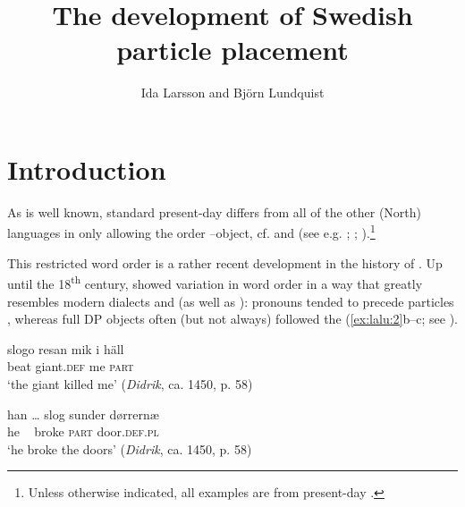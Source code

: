 \documentclass[output=paper]{langscibook}
\author{Ida Larsson\orcid{}\affiliation{Østfold University College, Halden} and Björn Lundquist\affiliation{The Arctic University of Norway, Tromsø}}
\title{The development of Swedish particle placement}
\begin{document}
\maketitle 

\section{Introduction}\label{sec:lalu:1}

\begin{sloppypar}
As is well known, standard present-day  differs from all of the other (North)  languages in only allowing the order –object, cf.  and  (see e.g. \citealt{Svenonius1996, Svenonius2003, Svenonius1996}; \citealt{Toivonen2003}; \citealt{Lundquist2014Active}).\footnote{Unless otherwise indicated, all examples are from present-day .}
\end{sloppypar}

\ea\label{ex:lalu:1}
\z
\z


This restricted word order is a rather recent development in the history of . Up until the 18\textsuperscript{th} century,  showed variation in word order in a way that greatly resembles modern  dialects and  (as well as ): pronouns tended to precede particles , whereas full DP objects often (but not always) followed the  (\ref{ex:lalu:2}b–c; see \citealt{LarssonLundquist2014}).


\ea\label{ex:lalu:2}
\ea\label{ex:lalu:2a}
\gll  slogo  resan       mik     {i häll}\\
 beat     giant.\textsc{def}   me     \textsc{part}\\
  \glt `the giant killed me’ (\textit{Didrik}, ca. 1450, p. 58)

\ex   \label{ex:lalu:2b}
\gll han …   slog  sunder   dørrernæ\\
      he  ~           broke  \textsc{part}       door\textsc{.def.pl}\\
  \glt   ‘he broke the doors’ (\textit{Didrik}, ca. 1450, p. 58)
\end{document}
